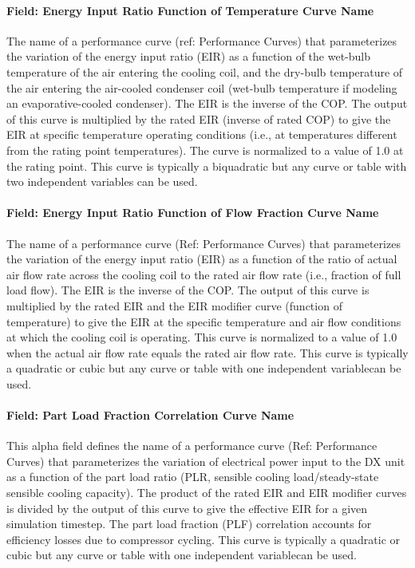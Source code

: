\paragraph{Field: Energy Input Ratio Function of Temperature Curve Name}\label{field-energy-input-ratio-function-of-temperature-curve-name}

The name of a performance curve (ref: Performance Curves) that parameterizes the variation of the energy input ratio (EIR) as a function of the wet-bulb temperature of the air entering the cooling coil, and the dry-bulb temperature of the air entering the air-cooled condenser coil (wet-bulb temperature if modeling an evaporative-cooled condenser). The EIR is the inverse of the COP. The output of this curve is multiplied by the rated EIR (inverse of rated COP) to give the EIR at specific temperature operating conditions (i.e., at temperatures different from the rating point temperatures). The curve is normalized to a value of 1.0 at the rating point. This curve is typically a biquadratic but any curve or table with two independent variables can be used.

\paragraph{Field: Energy Input Ratio Function of Flow Fraction Curve Name}\label{field-energy-input-ratio-function-of-flow-fraction-curve-name}

The name of a performance curve (Ref: Performance Curves) that parameterizes the variation of the energy input ratio (EIR) as a function of the ratio of actual air flow rate across the cooling coil to the rated air flow rate (i.e., fraction of full load flow). The EIR is the inverse of the COP. The output of this curve is multiplied by the rated EIR and the EIR modifier curve (function of temperature) to give the EIR at the specific temperature and air flow conditions at which the cooling coil is operating. This curve is normalized to a value of 1.0 when the actual air flow rate equals the rated air flow rate. This curve is typically a quadratic or cubic but any curve or table with one independent variablecan be used.

\paragraph{Field: Part Load Fraction Correlation Curve Name}\label{field-part-load-fraction-correlation-curve-name-2}

This alpha field defines the name of a performance curve (Ref: Performance Curves) that parameterizes the variation of electrical power input to the DX unit as a function of the part load ratio (PLR, sensible cooling load/steady-state sensible cooling capacity). The product of the rated EIR and EIR modifier curves is divided by the output of this curve to give the effective EIR for a given simulation timestep. The part load fraction (PLF) correlation accounts for efficiency losses due to compressor cycling. This curve is typically a quadratic or cubic but any curve or table with one independent variablecan be used.


